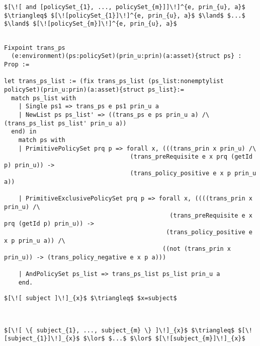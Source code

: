 \lstset{mathescape, language=AST}  
\begin{lstlisting}[frame=single, caption={Policy Set Translation {$\colon$} AndPolicySet},label={lst:transpolicyformulaAndPolicySet}]
$[\![ and [policySet_{1}, ..., policySet_{m}]]\!]^{e, prin_{u}, a}$ $\triangleq$ $[\![policySet_{1}]\!]^{e, prin_{u}, a}$ $\land$ $...$ $\land$ $[\![policySet_{m}]\!]^{e, prin_{u}, a}$

\end{lstlisting}



\begin{lstlisting}

Fixpoint trans_ps
  (e:environment)(ps:policySet)(prin_u:prin)(a:asset){struct ps} : Prop :=

let trans_ps_list := (fix trans_ps_list (ps_list:nonemptylist policySet)(prin_u:prin)(a:asset){struct ps_list}:=
  match ps_list with
    | Single ps1 => trans_ps e ps1 prin_u a
    | NewList ps ps_list' => ((trans_ps e ps prin_u a) /\ (trans_ps_list ps_list' prin_u a))
  end) in
    match ps with
    | PrimitivePolicySet prq p => forall x, (((trans_prin x prin_u) /\ 
                                   (trans_preRequisite e x prq (getId p) prin_u)) -> 
                                   (trans_policy_positive e x p prin_u a))  

    | PrimitiveExclusivePolicySet prq p => forall x, ((((trans_prin x prin_u) /\ 
                                              (trans_preRequisite e x prq (getId p) prin_u)) -> 
                                             (trans_policy_positive e x p prin_u a)) /\
                                            ((not (trans_prin x prin_u)) -> (trans_policy_negative e x p a)))
                   
    | AndPolicySet ps_list => trans_ps_list ps_list prin_u a
    end.
\end{lstlisting}

\lstset{mathescape, language=AST}  
\begin{lstlisting}[frame=single, caption={Prin Translation {$\colon$} Single subject},label={lst:transprinSingle}]
$[\![ subject ]\!]_{x}$ $\triangleq$ $x=subject$

\end{lstlisting}

\lstset{mathescape, language=AST}  
\begin{lstlisting}[frame=single, caption={Prin Translation {$\colon$} List of subjects},label={lst:transprinListOfSubjects}]


$[\![ \{ subject_{1}, ..., subject_{m} \} ]\!]_{x}$ $\triangleq$ $[\![subject_{1}]\!]_{x}$ $\lor$ $...$ $\lor$ $[\![subject_{m}]\!]_{x}$

\end{lstlisting}

